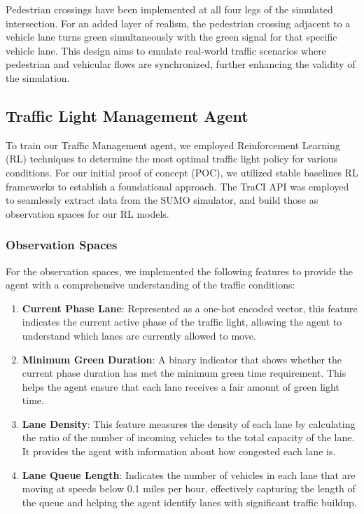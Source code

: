 Pedestrian crossings have been implemented at all four legs of the simulated intersection. For an added layer of realism, the pedestrian crossing adjacent to a vehicle lane turns green simultaneously with the green signal for that specific vehicle lane. This design aims to emulate real-world traffic scenarios where pedestrian and vehicular flows are synchronized, further enhancing the validity of the simulation.

\subsection{Traffic Light Management Agent}

To train our Traffic Management agent, we employed Reinforcement Learning (RL) techniques to determine the most optimal traffic light policy for various conditions. For our initial proof of concept (POC), we utilized stable baselines RL frameworks to establish a foundational approach. The TraCI API was employed to seamlessly extract data from the SUMO simulator, and build those as observation spaces for our RL models.

\subsubsection{Observation Spaces}

For the observation spaces, we implemented the following features to provide the agent with a comprehensive understanding of the traffic conditions:

\begin{enumerate}
    \item \textbf{Current Phase Lane}: Represented as a one-hot encoded vector, this feature indicates the current active phase of the traffic light, allowing the agent to understand which lanes are currently allowed to move.
    \item \textbf{Minimum Green Duration}: A binary indicator that shows whether the current phase duration has met the minimum green time requirement. This helps the agent ensure that each lane receives a fair amount of green light time.
    \item \textbf{Lane Density}: This feature measures the density of each lane by calculating the ratio of the number of incoming vehicles to the total capacity of the lane. It provides the agent with information about how congested each lane is.
    \item \textbf{Lane Queue Length}: Indicates the number of vehicles in each lane that are moving at speeds below 0.1 miles per hour, effectively capturing the length of the queue and helping the agent identify lanes with significant traffic buildup.
\end{enumerate}


